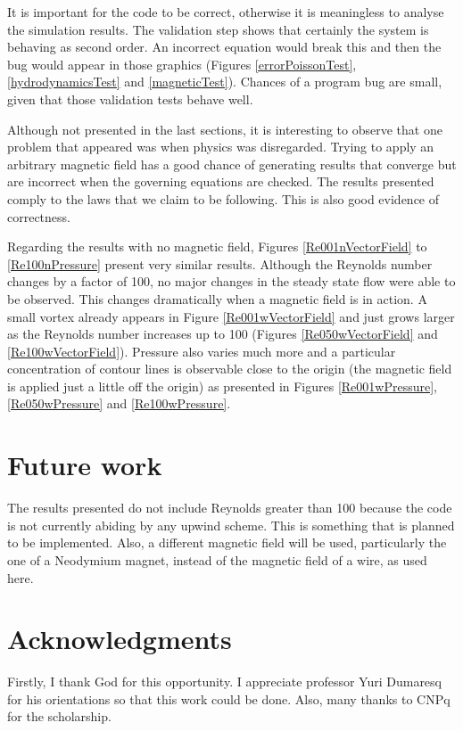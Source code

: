 \documentclass[journal]{IEEEtran}
\begin{document}
It is important for the code to be correct, otherwise it is meaningless to analyse the simulation results. The validation step shows that certainly the system is behaving as second order. An incorrect equation would break this and then the bug would appear in those graphics (Figures \ref{errorPoissonTest}, \ref{hydrodynamicsTest} and \ref{magneticTest}). Chances of a program bug are small, given that those validation tests behave well.

Although not presented in the last sections, it is interesting to observe that one problem that appeared was when physics was disregarded. Trying to apply an arbitrary magnetic field has a good chance of generating results that converge but are incorrect when the governing equations are checked. The results presented comply to the laws that we claim to be following. This is also good evidence of correctness.

Regarding the results with no magnetic field, Figures \ref{Re001nVectorField} to \ref{Re100nPressure} present very similar results. Although the Reynolds number changes by a factor of 100, no major changes in the steady state flow were able to be observed. This changes dramatically when a magnetic field is in action. A small vortex already appears in Figure \ref{Re001wVectorField} and just grows larger as the Reynolds number increases up to 100 (Figures \ref{Re050wVectorField} and \ref{Re100wVectorField}). Pressure also varies much more and a particular concentration of contour lines is observable close to the origin (the magnetic field is applied just a little off the origin) as presented in Figures \ref{Re001wPressure}, \ref{Re050wPressure} and \ref{Re100wPressure}.

\section{Future work}
The results presented do not include Reynolds greater than 100 because the code is not currently abiding by any upwind scheme. This is something that is planned to be implemented. Also, a different magnetic field will be used, particularly the one of a Neodymium magnet, instead of the magnetic field of a wire, as used here.




\section*{Acknowledgments}

Firstly, I thank God for this opportunity. I appreciate professor Yuri Dumaresq for his orientations so that this work could be done. Also, many thanks to CNPq for the scholarship.




\end{document}
